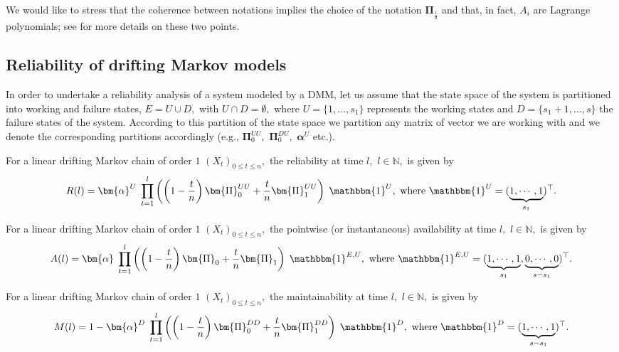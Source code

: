 \documentclass[article,nojss]{jss}\usepackage[]{graphicx}\usepackage[]{color}
\begin{document}
We would like to stress that the coherence between notations implies the choice of the notation $\bm{\Pi}_{\frac{i}{d}}$ and that, in fact, $A_i$ are Lagrange polynomials; see \citet{Ver08} for more details on these two points.


\subsection{Reliability of drifting Markov models} \label{subsection_rel}

In order to undertake a reliability analysis of a system modeled by a DMM, let us assume that the state space of the system is partitioned into working and failure states, $ E=U \cup D,$ with $U \cap D=\emptyset,$ where $U=\{1,\ldots,s_1\}$ represents the  working states and $D=\{s_1+1,\ldots,s\}$  the failure states of the system. According to this partition of the state space we partition any matrix of vector we are working with and we denote the corresponding partitions accordingly (e.g., $\bm{\Pi}_0^{UU},$ $\bm{\Pi}_0^{DU},$ $\bm{\alpha}^{U}$ etc.).

\begin{proposition}\label{prop_RelDrift}
For a linear drifting Markov chain of order $1$ $(X_t)_{0 \leq t \leq n},$ the reliability at time $l,$ $l \in \mathbb N,$ is given by
%
\begin{equation} \label{eq_RelDrift}
R(l) = \bm{\alpha}^{U} \; \prod_{t=1}^l \left( \left(1 - \frac{t}{n}\right) \bm{\Pi}_0^{UU} + \frac{t}{n} \bm{\Pi}_1^{UU} \right) \; \mathbbm{1}^U,
\textrm{ where } \mathbbm{1}^U = (\underbrace{1, \cdots, 1}_{s_1})^{\top}.
\end{equation}
%
\end{proposition}

\begin{proposition}\label{prop_AvDrift}
For a linear drifting Markov chain of order $1$ $(X_t)_{0 \leq t \leq n},$ the pointwise (or instantaneous) availability at time $l,$ $l \in \mathbb N,$ is given by
%
\begin{equation} \label{eq_AvDrift}
A(l) = \bm{\alpha} \; \prod_{t=1}^l \left( \left(1 - \frac{t}{n}\right) \bm{\Pi}_0 + \frac{t}{n} \bm{\Pi}_1 \right) \; \mathbbm{1}^{E,U}, \textrm{ where }  \mathbbm{1}^{E,U} = (\underbrace{1, \cdots, 1}_{s_1}, \underbrace{0, \cdots, 0}_{s-s_1} )^{\top}.
\end{equation}
%
\end{proposition}

\begin{proposition}\label{prop_MaintDrift}
For a linear drifting Markov chain of order $1$ $(X_t)_{0 \leq t \leq n},$ the maintainability  	at time $l,$ $l \in \mathbb N,$ is given by
%
\begin{equation} \label{eq_MaintDrift_gen}
M(l) = 1 -  \bm{\alpha}^{D} \; \prod_{t=1}^l \left( \left(1 - \frac{t}{n}\right) \bm{\Pi}_0^{DD} + \frac{t}{n} \bm{\Pi}_1^{DD} \right) \; \mathbbm{1}^D,
\textrm{ where } \mathbbm{1}^D = (\underbrace{1, \cdots, 1}_{s-s_1})^{\top}.
\end{equation}
%
\end{proposition}
\end{document}
